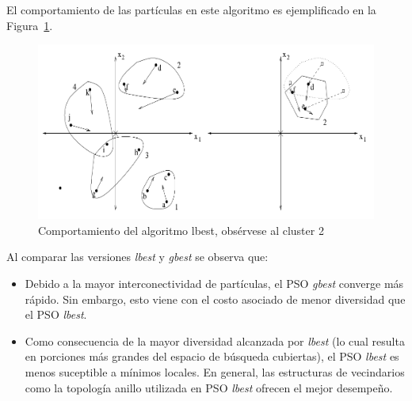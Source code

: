\documentclass{article}
\begin{document}
El comportamiento de las partículas en este algoritmo es ejemplificado en la Figura~\ref{fig:lbest-behavior}.
\begin{figure}[]
	\centering
	\includegraphics[width=\textwidth]{../resources/lbest-behavior}
	\caption{Comportamiento del algoritmo lbest, obsérvese al cluster 2}
	\label{fig:lbest-behavior}
\end{figure}

Al comparar las versiones \emph{lbest} y \emph{gbest} se observa que:
\begin{itemize}
	\item Debido a la mayor interconectividad de partículas, el PSO \emph{gbest} converge más rápido.
	Sin embargo, esto viene con el costo asociado de menor diversidad que el PSO \emph{lbest}.
	\item Como consecuencia de la mayor diversidad alcanzada por \emph{lbest} (lo cual resulta en porciones más grandes del espacio de búsqueda cubiertas), el PSO \emph{lbest} es menos suceptible a mínimos locales.
	En general, las estructuras de vecindarios como la topología anillo utilizada en PSO \emph{lbest} ofrecen el mejor desempeño.
\end{itemize}
\end{document}
